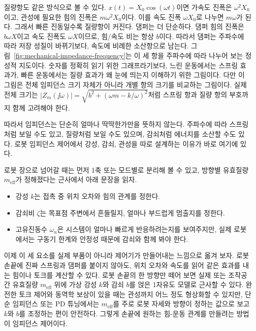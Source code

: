 질량항도 같은 방식으로 볼 수 있다.
$x(t)=X_0\cos(\omega t)$이면 가속도 진폭은 $\omega^2X_0$이고, 관성에 필요한 힘의 진폭은 $m\omega^2X_0$이다.
이를 속도 진폭 $\omega X_0$로 나누면 $m\omega$가 된다.
그래서 빠른 진동일수록 질량항이 커진다.
댐퍼는 더 단순하다.
댐퍼 힘의 진폭은 $b\omega X$이고 속도 진폭도 $\omega X$이므로, 힘/속도 비는 항상 $b$이다.
따라서 댐퍼는 주파수에 따라 저장 성질이 바뀌기보다, 속도에 비례한 소산항으로 남는다.
그림~\ref{fig:mechanical-impedance-frequency}는 이 세 항을 주파수에 따라 나누어 보는 정성적 지도이다.
숫자를 정확히 읽기 위한 그래프라기보다, 느린 운동에서는 스프링 효과가, 빠른 운동에서는 질량 효과가 왜 눈에 띄는지 이해하기 위한 그림이다.
다만 이 그림은 전체 임피던스 크기 자체가 아니라 개별 항의 크기를 비교하는 그림이다.
실제 전체 크기는 $|Z_m(\jj\omega)|=\sqrt{b^2+(\omega m-k/\omega)^2}$처럼 스프링 항과 질량 항의 부호까지 함께 고려해야 한다.



따라서 임피던스는 단순히 얼마나 딱딱한가만을 뜻하지 않는다.
주파수에 따라 스프링처럼 보일 수도 있고, 질량처럼 보일 수도 있으며, 감쇠처럼 에너지를 소산할 수도 있다.
로봇 임피던스 제어에서 강성, 감쇠, 관성을 따로 설계하는 이유가 바로 여기에 있다.

로봇 장으로 넘어갈 때는 먼저 1축 또는 모드별로 분리해 볼 수 있고, 방향별 유효질량 $m_{\mathrm{eff}}$가 정해졌다는 근사에서 아래 문장을 읽자.
\begin{itemize}
  \item 강성 $k$는 접촉 중 위치 오차와 힘의 관계를 정한다.
  \item 감쇠비 $\zeta$는 목표점 주변에서 흔들릴지, 얼마나 부드럽게 멈출지를 정한다.
  \item 고유진동수 $\omega_n$은 시스템이 얼마나 빠르게 반응하려는지를 보여주지만, 실제 로봇에서는 구동기 한계와 안정성 때문에 감쇠와 함께 봐야 한다.
\end{itemize}
이제 이 세 요소를 실제 부품이 아니라 제어기가 만들어내는 느낌으로 옮겨 보자.
로봇 손끝에 진짜 스프링과 댐퍼를 붙이지 않아도, 위치 오차와 속도를 읽어 같은 효과를 내는 힘이나 토크를 계산할 수 있다.
로봇 손끝의 한 방향만 떼어 보면 실제 또는 조작공간 유효질량 $m_{\mathrm{eff}}$ 위에 가상 강성 $k$와 감쇠 $b$를 얹은 1자유도 모델로 근사할 수 있다.
완전한 토크 제어와 동역학 보상이 있을 때는 관성까지 어느 정도 형상화할 수 있지만, 단순 임피던스 또는 PD 튜닝에서는 $m_{\mathrm{eff}}$를 주로 로봇 자세와 방향이 정하는 값으로 보고 $k$와 $b$를 조정하는 편이 안전하다.
그렇게 손끝에 원하는 힘-운동 관계를 만들려는 방법이 임피던스 제어이다.
